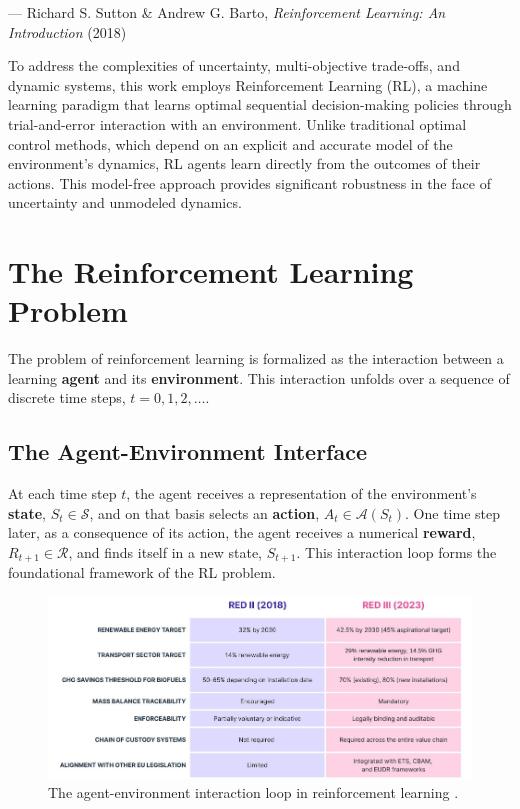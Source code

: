 \vspace{0.5cm}

\begin{flushright}
--- Richard S. Sutton \& Andrew G. Barto, \textit{Reinforcement Learning: An Introduction} (2018) \cite{Sutton2018}
\end{flushright}

\noindent
To address the complexities of uncertainty, multi-objective trade-offs, and dynamic systems, this work employs Reinforcement Learning (RL), a machine learning paradigm that learns optimal sequential decision-making policies through trial-and-error interaction with an environment. Unlike traditional optimal control methods, which depend on an explicit and accurate model of the environment's dynamics, RL agents learn directly from the outcomes of their actions. This model-free approach provides significant robustness in the face of uncertainty and unmodeled dynamics.

\section{The Reinforcement Learning Problem}
The problem of reinforcement learning is formalized as the interaction between a learning \textbf{agent} and its \textbf{environment}. This interaction unfolds over a sequence of discrete time steps, $t = 0, 1, 2, \dots$.

\subsection{The Agent-Environment Interface}
At each time step $t$, the agent receives a representation of the environment's \textbf{state}, $S_t \in \mathcal{S}$, and on that basis selects an \textbf{action}, $A_t \in \mathcal{A}(S_t)$. One time step later, as a consequence of its action, the agent receives a numerical \textbf{reward}, $R_{t+1} \in \mathcal{R}$, and finds itself in a new state, $S_{t+1}$. This interaction loop forms the foundational framework of the RL problem.

\begin{figure}[h!]
    \centering
    \includegraphics[width=0.8\linewidth]{red.png}
    \caption{The agent-environment interaction loop in reinforcement learning \cite{Sutton2018}.}
    \label{fig:rl_loop}
\end{figure}

